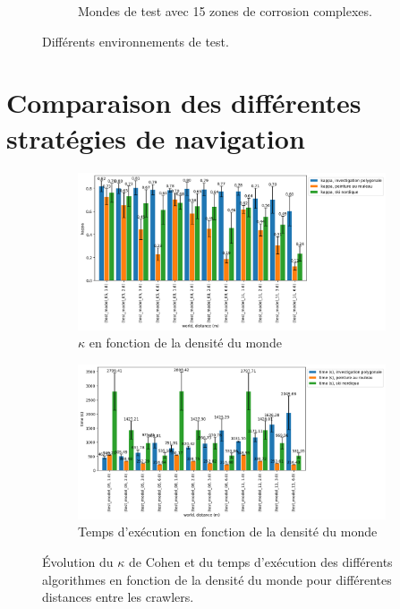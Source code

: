 \documentclass[francais,RandD]{rapportPFE}
\begin{document}
\begin{figure}[H]
\begin{subfigure}[t]{0.15\linewidth}
				\caption{Mondes de test avec 15 zones de corrosion complexes.}
				\label{fig:test_model_15_complex_1}
			\end{subfigure}
			\caption{Différents environnements de test.}
			\label{fig:test_models}
		\end{figure}
	\section{Comparaison des différentes stratégies de navigation}
		\label{annexe:comparaison}
		\begin{figure}[H]
			\begin{subfigure}[t]{0.9\linewidth}
				\includegraphics[width=\linewidth]{graphics/investigation_polygonale-peinture_au_rouleau_ski_nordique-kappa_for_each_d_vs_investigation_polygonale-kappa_for_each_d.png}
				\caption{$\kappa$ en fonction de la densité du monde}
				\label{fig:investigation_polygonale-peinture_au_rouleau_ski_nordique-kappa_for_each_d_vs_investigation_polygonale-kappa_for_each_d}
			\end{subfigure}
			\hfill
			\begin{subfigure}[t]{0.9\linewidth}
					\includegraphics[width=\linewidth]{graphics/investigation_polygonale-peinture_au_rouleau_ski_nordique-time_for_each_d_vs_investigation_polygonale-time_for_each_d.png}
					\caption{Temps d'exécution en fonction de la densité du monde}
					\label{fig:investigation_polygonale-peinture_au_rouleau_ski_nordique-time_for_each_d_vs_investigation_polygonale-time_for_each_d}
			\end{subfigure}
			\caption{Évolution du $\kappa$ de Cohen et du temps d'exécution des différents algorithmes en fonction de la densité du monde pour différentes distances entre les crawlers.}
			\label{fig:investigation_polygonale-peinture_au_rouleau_ski_nordique_for_each_d}
		\end{figure}
\end{document}
